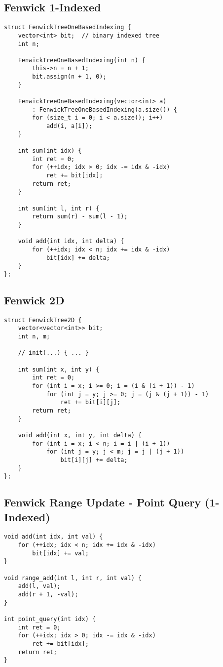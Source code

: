 \documentclass{article}
\begin{document}
\subsection{Fenwick 1-Indexed}
\begin{lstlisting}
struct FenwickTreeOneBasedIndexing {
    vector<int> bit;  // binary indexed tree
    int n;

    FenwickTreeOneBasedIndexing(int n) {
        this->n = n + 1;
        bit.assign(n + 1, 0);
    }

    FenwickTreeOneBasedIndexing(vector<int> a)
        : FenwickTreeOneBasedIndexing(a.size()) {
        for (size_t i = 0; i < a.size(); i++)
            add(i, a[i]);
    }

    int sum(int idx) {
        int ret = 0;
        for (++idx; idx > 0; idx -= idx & -idx)
            ret += bit[idx];
        return ret;
    }

    int sum(int l, int r) {
        return sum(r) - sum(l - 1);
    }

    void add(int idx, int delta) {
        for (++idx; idx < n; idx += idx & -idx)
            bit[idx] += delta;
    }
};
\end{lstlisting}
\subsection{Fenwick 2D}
\begin{lstlisting}
struct FenwickTree2D {
    vector<vector<int>> bit;
    int n, m;

    // init(...) { ... }

    int sum(int x, int y) {
        int ret = 0;
        for (int i = x; i >= 0; i = (i & (i + 1)) - 1)
            for (int j = y; j >= 0; j = (j & (j + 1)) - 1)
                ret += bit[i][j];
        return ret;
    }

    void add(int x, int y, int delta) {
        for (int i = x; i < n; i = i | (i + 1))
            for (int j = y; j < m; j = j | (j + 1))
                bit[i][j] += delta;
    }
};
\end{lstlisting}

\subsection{Fenwick Range Update - Point Query (1-Indexed)}
\begin{lstlisting}
void add(int idx, int val) {
    for (++idx; idx < n; idx += idx & -idx)
        bit[idx] += val;
}

void range_add(int l, int r, int val) {
    add(l, val);
    add(r + 1, -val);
}

int point_query(int idx) {
    int ret = 0;
    for (++idx; idx > 0; idx -= idx & -idx)
        ret += bit[idx];
    return ret;
}
\end{lstlisting}
\end{document}
